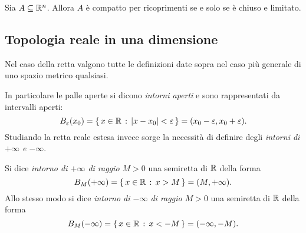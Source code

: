 \begin{theorem}
     \label{th:heine-borel}
    Sia $A \subseteq \R^n$. Allora $A$ è compatto per ricoprimenti se e solo se è chiuso e limitato.
\end{theorem}

\subsection{Topologia reale in una dimensione}

Nel caso della retta valgono tutte le definizioni date sopra nel caso più generale di uno spazio metrico qualsiasi.

In particolare le palle aperte si dicono \emph{intorni aperti} e sono rappresentati da intervalli aperti: \[
    \oB{x_0} = \set{x \in \R \suchthat \abs*{x - x_0} < \eps} = (x_0 - \eps, x_0 + \eps).    
\] Studiando la retta reale estesa invece sorge la necessità di definire degli \emph{intorni di $+\infty$ e $-\infty$}.

Si dice \emph{intorno di $+\infty$ di raggio $M > 0$} una semiretta di $\R$ della forma \[
    \oB[M]{+\infty} = \set{x \in \R \suchthat x > M} = (M, +\infty).
\] Allo stesso modo si dice \emph{intorno di $-\infty$ di raggio $M > 0$} una semiretta di $\R$ della forma \[
    \oB[M]{-\infty} = \set{x \in \R \suchthat x < -M} = (-\infty, -M).
\] 
